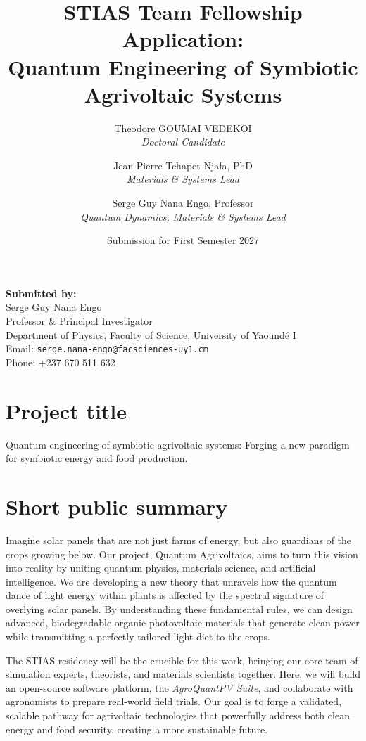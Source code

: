 \documentclass[11pt,a4paper]{article}
\title{\bf STIAS Team Fellowship Application:\\ Quantum Engineering of Symbiotic Agrivoltaic Systems}
\author{
  Theodore GOUMAI VEDEKOI \\
  \textit{Doctoral Candidate} \\[0.5em]
  \and
  Jean-Pierre Tchapet Njafa, PhD \\
  \textit{Materials \& Systems Lead} \\[0.5em]
  \and
  Serge Guy Nana Engo, Professor \\
  \textit{Quantum Dynamics, Materials \& Systems Lead}
}
\date{Submission for First Semester 2027}
\newcommand{\email}[1]{\texttt{#1}}
\begin{document}
\maketitle
\thispagestyle{empty}
\vspace{2em}

\begin{flushleft}
  \textbf{Submitted by:} \\
  Serge Guy Nana Engo \\
  Professor \& Principal Investigator \\
  Department of Physics, Faculty of Science, University of Yaoundé I \\
  Email: \email{serge.nana-engo@facsciences-uy1.cm} \\
  Phone: +237 670 511 632
\end{flushleft}
\clearpage

\section*{Project title}
Quantum engineering of symbiotic agrivoltaic systems: Forging a new paradigm for symbiotic energy and food production.

\section*{Short public summary}

Imagine solar panels that are not just farms of energy, but also guardians of the crops growing below. Our project, Quantum Agrivoltaics, aims to turn this vision into reality by uniting quantum physics, materials science, and artificial intelligence. We are developing a new theory that unravels how the quantum dance of light energy within plants is affected by the spectral signature of overlying solar panels. By understanding these fundamental rules, we can design advanced, biodegradable organic photovoltaic materials that generate clean power while transmitting a perfectly tailored light diet to the crops.

The STIAS residency will be the crucible for this work, bringing our core team of simulation experts, theorists, and materials scientists together. Here, we will build an open-source software platform, the \textit{AgroQuantPV Suite}, and collaborate with agronomists to prepare real-world field trials. Our goal is to forge a validated, scalable pathway for agrivoltaic technologies that powerfully address both clean energy and food security, creating a more sustainable future.
\end{document}

